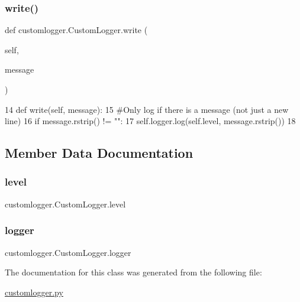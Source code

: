 \subsubsection{\texorpdfstring{write()}{write()}}
{\footnotesize\ttfamily def customlogger.\+Custom\+Logger.\+write (\begin{DoxyParamCaption}\item[{}]{self,  }\item[{}]{message }\end{DoxyParamCaption})}


\begin{DoxyCode}
14      \textcolor{keyword}{def }write(self, message):
15           \textcolor{comment}{#Only log if there is a message (not just a new line)}
16           \textcolor{keywordflow}{if} message.rstrip() != \textcolor{stringliteral}{""}:
17                self.logger.log(self.level, message.rstrip())
18 \end{DoxyCode}


\subsection{Member Data Documentation}
\mbox{\label{classcustomlogger_1_1CustomLogger_aa1e8b5f7e7dd6b9a1c2db6e66f3c3da6}} 
\subsubsection{\texorpdfstring{level}{level}}
{\footnotesize\ttfamily customlogger.\+Custom\+Logger.\+level}

\mbox{\label{classcustomlogger_1_1CustomLogger_a800aa033e5fd2a8fc1e108a6046fd7fe}} 
\subsubsection{\texorpdfstring{logger}{logger}}
{\footnotesize\ttfamily customlogger.\+Custom\+Logger.\+logger}



The documentation for this class was generated from the following file\+:\begin{DoxyCompactItemize}
\item 
\hyperlink{customlogger_8py}{customlogger.\+py}\end{DoxyCompactItemize}
